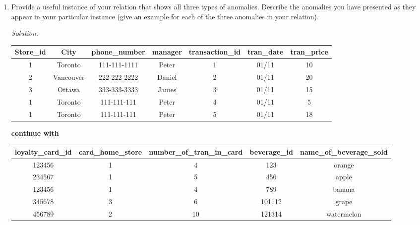 \documentclass[10pt]{article}
\begin{document}
\begin{enumerate}
\begin{enumerate}
        \item Provide a useful instance of your relation that shows all three types of anomalies. Describe the anomalies you have presented as they appear in your particular instance (give an example for each of the three anomalies in your relation).
        
        \begin{mdframed}[leftmargin=-6.5mm]
        \textit{Solution}.\\
\begin{center}
\begin{tabular}{| c | c | c | c | c | c | c |}
\hline
Store\_id & City      & phone\_number & manager & transaction\_id & tran\_date & tran\_price\\
\hline
1     & Toronto   & 111-111-1111  & Peter   & 1           & 01/11      & 10         \\
\hline
2     & Vancouver & 222-222-2222  & Daniel  & 2           & 01/11      & 20         \\
\hline
3     & Ottawa    & 333-333-3333  & James   & 3           & 01/11      & 15         \\
\hline
1     & Toronto   & 111-111-111   & Peter   & 4           & 01/11      & 5          \\
\hline
1     & Toronto   & 111-111-111   & Peter   & 5           & 01/11      &18          \\
\hline
\end{tabular}
\end{center}
\textbf{continue with}
\begin{center}
\begin{tabular}{| c | c | c | c | c |}
\hline
loyalty\_card\_id & card\_home\_store & number\_of\_tran\_in\_card & beverage\_id & name\_of\_beverage\_sold \\
\hline
123456        & 1                 & 4            & 123              & orange\\
\hline
234567        & 1                 & 5            & 456              & apple \\
\hline
123456        & 1                 & 4            & 789              & banana \\
\hline
345678        & 3                 & 6            & 101112              & grape\\
\hline
456789        & 2                 & 10           & 121314              & watermelon\\
\hline
\end{tabular}
\end{center}

\end{mdframed}
\end{enumerate}
\end{enumerate}
\end{document}
